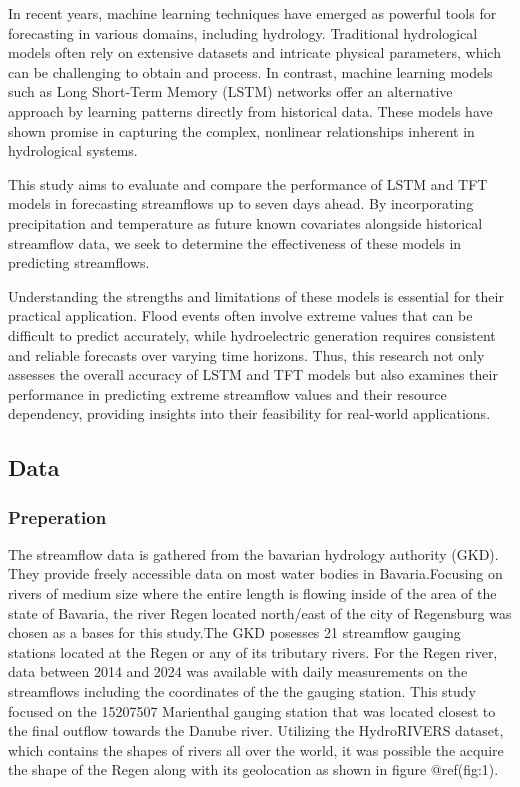 \documentclass[
]{article}
\begin{document}
In recent years, machine learning techniques have emerged as powerful
tools for forecasting in various domains, including hydrology.
Traditional hydrological models often rely on extensive datasets and
intricate physical parameters, which can be challenging to obtain and
process. In contrast, machine learning models such as Long Short-Term
Memory (LSTM) networks offer an alternative approach by learning
patterns directly from historical data. These models have shown promise
in capturing the complex, nonlinear relationships inherent in
hydrological systems.

This study aims to evaluate and compare the performance of LSTM and TFT
models in forecasting streamflows up to seven days ahead. By
incorporating precipitation and temperature as future known covariates
alongside historical streamflow data, we seek to determine the
effectiveness of these models in predicting streamflows.

Understanding the strengths and limitations of these models is essential
for their practical application. Flood events often involve extreme
values that can be difficult to predict accurately, while hydroelectric
generation requires consistent and reliable forecasts over varying time
horizons. Thus, this research not only assesses the overall accuracy of
LSTM and TFT models but also examines their performance in predicting
extreme streamflow values and their resource dependency, providing
insights into their feasibility for real-world applications.

\hypertarget{data}{%
\subsection{Data}\label{data}}

\hypertarget{preperation}{%
\subsubsection{Preperation}\label{preperation}}

The streamflow data is gathered from the bavarian hydrology authority
(GKD). They provide freely accessible data on most water bodies in
Bavaria.Focusing on rivers of medium size where the entire length is
flowing inside of the area of the state of Bavaria, the river Regen
located north/east of the city of Regensburg was chosen as a bases for
this study.The GKD posesses 21 streamflow gauging stations located at
the Regen or any of its tributary rivers. For the Regen river, data
between 2014 and 2024 was available with daily measurements on the
streamflows including the coordinates of the the gauging station. This
study focused on the 15207507 Marienthal gauging station that was
located closest to the final outflow towards the Danube river. Utilizing
the HydroRIVERS dataset, which contains the shapes of rivers all over
the world, it was possible the acquire the shape of the Regen along with
its geolocation as shown in figure @ref(fig:1).
\end{document}
